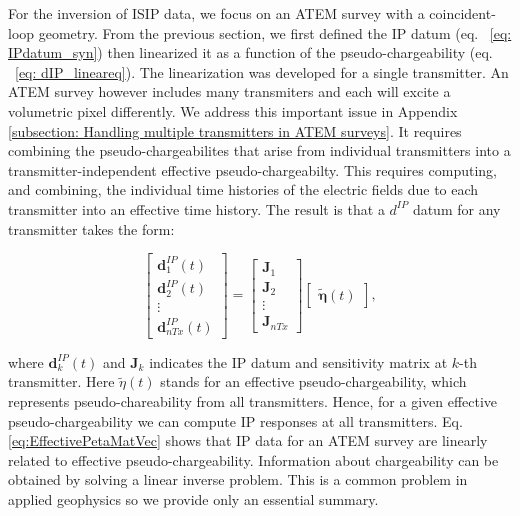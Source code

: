 \documentclass[extra,mreferee]{gji}
\newcommand{\peta}{\tilde{\eta}}
\newcommand{\dip}{d^{IP}}
\begin{document}
For the inversion of ISIP data, we focus on an ATEM survey with a coincident-loop geometry.
From the previous section, we first defined the IP datum (eq. ~\ref{eq: IPdatum_syn}) then linearized it as a function of the pseudo-chargeability (eq. ~\ref{eq: dIP_lineareq}). The linearization was developed for a single transmitter. An ATEM survey however includes many transmiters and each will excite a volumetric pixel differently. We address this important issue in Appendix \ref{subsection: Handling multiple transmitters in ATEM surveys}. It requires combining the pseudo-chargeabilites that arise from individual transmitters into a transmitter-independent effective pseudo-chargeabilty. This requires computing, and combining, the individual time histories of the electric fields due to each transmitter into an effective time history. The result is that a $\dip$ datum for any transmitter takes the form:
\begin{linenomath*}
\begin{equation}
  \left[ \begin{array}{c} \mathbf{d}^{IP}_1(t) \\ \mathbf{d}^{IP}_2(t) \\ \vdots \\
  \mathbf{d}^{IP}_{nTx}(t) \end{array} \right] = \left[\begin{array}{c} \mathbf{J}_1 \\ \mathbf{J}_2 \\ \vdots \\  \mathbf{J}_{nTx} \end{array}\right] \left[ \begin{array}{c} \mathbf{\peta}(t) \end{array} \right],
  \label{eq:EffectivePetaMatVec}
\end{equation}
\end{linenomath*}
where $\mathbf{d}^{IP}_k (t)$ and $\mathbf{J}_k$ indicates the IP datum and sensitivity matrix at $k$-th transmitter. Here $\peta(t)$ stands for an effective pseudo-chargeability, which represents pseudo-chareability from all transmitters. Hence, for a given effective pseudo-chargeability we can compute IP responses at all transmitters.
Eq. \ref{eq:EffectivePetaMatVec} shows that IP data for an ATEM survey are linearly related to effective pseudo-chargeability. Information about chargeability can be obtained by solving a linear inverse problem. This is a common problem in applied geophysics so we provide only an essential summary.
\end{document}
